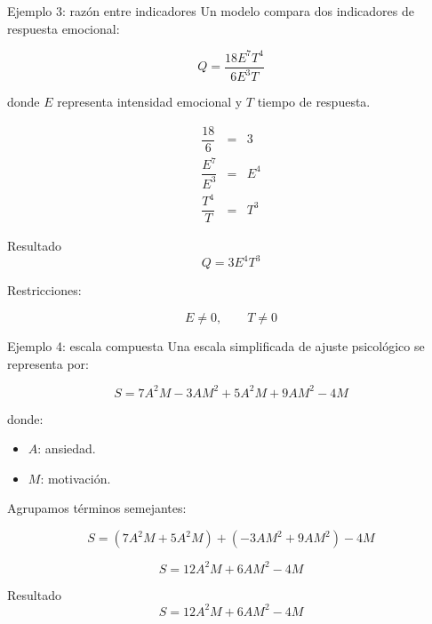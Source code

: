 \documentclass[aspectratio=169]{beamer}
\begin{document}
	\begin{frame}{Ejemplo 3: razón entre indicadores}
		Un modelo compara dos indicadores de respuesta emocional:
		
		\[
		Q=\frac{18E^7T^4}{6E^3T}
		\]
		
		donde \(E\) representa intensidad emocional y \(T\) tiempo de respuesta.
		
		\pause
		
		\[
		\begin{array}{rcl}
			\dfrac{18}{6} & = & 3 \\[0.3cm]
			\dfrac{E^7}{E^3} & = & E^4 \\[0.3cm]
			\dfrac{T^4}{T} & = & T^3
		\end{array}
		\]
		
		\pause
		
		\begin{block}{Resultado}
			\[
			Q=3E^4T^3
			\]
		\end{block}
		
		\pause
		
		\begin{alerta}
			Restricciones:
			
			\[
			E\neq0,\qquad T\neq0
			\]
		\end{alerta}
	\end{frame}
	
	
	\begin{frame}{Ejemplo 4: escala compuesta}
		Una escala simplificada de ajuste psicológico se representa por:
		
		\[
		S=7A^2M-3AM^2+5A^2M+9AM^2-4M
		\]
		
		donde:
		
		\begin{itemize}
			\item \(A\): ansiedad.
			\item \(M\): motivación.
		\end{itemize}
		
		\pause
		
		Agrupamos términos semejantes:
		
		\[
		S=(7A^2M+5A^2M)+(-3AM^2+9AM^2)-4M
		\]
		
		\pause
		
		\[
		S=12A^2M+6AM^2-4M
		\]
		
		\pause
		
		\begin{block}{Resultado}
			\[
			S=12A^2M+6AM^2-4M
			\]
		\end{block}
	\end{frame}
	
\end{document}
